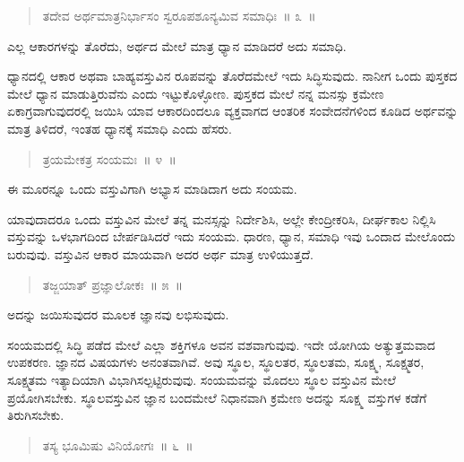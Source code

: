 \vspace{-0.36cm}

\begin{verse}
ತದೇವ ಅರ್ಥಮಾತ್ರನಿರ್ಭಾಸಂ ಸ್ವರೂಪಶೂನ್ಯಮಿವ ಸಮಾಧಿಃ~॥ ೩~॥
\end{verse}

\vspace{-0.4cm}

ಎಲ್ಲ ಆಕಾರಗಳನ್ನು ತೊರೆದು, ಅರ್ಥದ ಮೇಲೆ ಮಾತ್ರ ಧ್ಯಾನ ಮಾಡಿದರೆ ಅದು ಸಮಾಧಿ. 

ಧ್ಯಾನದಲ್ಲಿ ಆಕಾರ ಅಥವಾ ಬಾಹ್ಯವಸ್ತುವಿನ ರೂಪವನ್ನು ತೊರೆದಮೇಲೆ ಇದು ಸಿದ್ಧಿಸುವುದು. ನಾನೀಗ ಒಂದು ಪುಸ್ತಕದ ಮೇಲೆ ಧ್ಯಾನ ಮಾಡುತ್ತಿರುವೆನು ಎಂದು ಇಟ್ಟುಕೊಳ್ಳೋಣ. ಪುಸ್ತಕದ ಮೇಲೆ ನನ್ನ ಮನಸ್ಸು ಕ್ರಮೇಣ ಏಕಾಗ್ರವಾಗುವುದರಲ್ಲಿ ಜಯಿಸಿ ಯಾವ ಆಕಾರದಿಂದಲೂ ವ್ಯಕ್ತವಾಗದ ಆಂತರಿಕ ಸಂವೇದನೆಗಳಿಂದ ಕೂಡಿದ ಅರ್ಥವನ್ನು ಮಾತ್ರ ತಿಳಿದರೆ, ಇಂತಹ ಧ್ಯಾನಕ್ಕೆ ಸಮಾಧಿ ಎಂದು ಹೆಸರು. 

\vspace{-0.36cm}

\begin{verse}
ತ್ರಯಮೇಕತ್ರ ಸಂಯಮಃ~॥ ೪~॥
\end{verse}

\vspace{-0.4cm}

ಈ ಮೂರನ್ನೂ ಒಂದು ವಸ್ತುವಿಗಾಗಿ ಅಭ್ಯಾಸ ಮಾಡಿದಾಗ ಅದು ಸಂಯಮ. 

ಯಾವುದಾದರೂ ಒಂದು ವಸ್ತುವಿನ ಮೇಲೆ ತನ್ನ ಮನಸ್ಸನ್ನು ನಿರ್ದೇಶಿಸಿ, ಅಲ್ಲೇ ಕೇಂದ್ರೀಕರಿಸಿ, ದೀರ್ಘಕಾಲ ನಿಲ್ಲಿಸಿ ವಸ್ತುವನ್ನು ಒಳಭಾಗದಿಂದ ಬೇರ್ಪಡಿಸಿದರೆ ಇದು ಸಂಯಮ. ಧಾರಣ, ಧ್ಯಾನ, ಸಮಾಧಿ ಇವು ಒಂದಾದ ಮೇಲೊಂದು ಬರುವುವು. ವಸ್ತುವಿನ ಆಕಾರ ಮಾಯವಾಗಿ ಅದರ ಅರ್ಥ ಮಾತ್ರ ಉಳಿಯುತ್ತದೆ. 

\vspace{-0.36cm}

\begin{verse}
ತಜ್ಜಯಾತ್​ ಪ್ರಜ್ಞಾಲೋಕಃ~॥ ೫~॥
\end{verse}

\vspace{-0.4cm}

ಅದನ್ನು ಜಯಿಸುವುದರ ಮೂಲಕ ಜ್ಞಾನವು ಲಭಿಸುವುದು. 

ಸಂಯಮದಲ್ಲಿ ಸಿದ್ಧಿ ಪಡೆದ ಮೇಲೆ ಎಲ್ಲಾ ಶಕ್ತಿಗಳೂ ಅವನ ವಶವಾಗುವುವು. ಇದೇ ಯೋಗಿಯ ಅತ್ಯುತ್ತಮವಾದ ಉಪಕರಣ. ಜ್ಞಾನದ ವಿಷಯಗಳು ಅನಂತವಾಗಿವೆ. ಅವು ಸ್ಥೂಲ, ಸ್ಥೂಲತರ, ಸ್ಥೂಲತಮ, ಸೂಕ್ಷ್ಮ, ಸೂಕ್ಷ್ಮತರ, ಸೂಕ್ಷ್ಮತಮ ಇತ್ಯಾದಿಯಾಗಿ ವಿಭಾಗಿಸಲ್ಪಟ್ಟಿರುವುವು. ಸಂಯಮವನ್ನು ಮೊದಲು ಸ್ಥೂಲ ವಸ್ತುವಿನ ಮೇಲೆ ಪ್ರಯೋಗಿಸಬೇಕು. ಸ್ಥೂಲವಸ್ತುವಿನ ಜ್ಞಾನ ಬಂದಮೇಲೆ ನಿಧಾನವಾಗಿ ಕ್ರಮೇಣ ಅದನ್ನು ಸೂಕ್ಷ್ಮ ವಸ್ತುಗಳ ಕಡೆಗೆ ತಿರುಗಿಸಬೇಕು. 

\vspace{-0.3cm}

\begin{verse}
ತಸ್ಯ ಭೂಮಿಷು ವಿನಿಯೋಗಃ~॥ ೬~॥
\end{verse}

